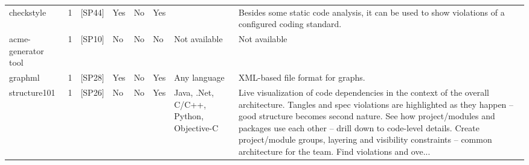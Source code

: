 \begin{tabular}{lrllllll}
          checkstyle &      1 &                                                 [SP44] &   Yes &       No &       Yes &                                                                                                                                                                                         &                                                                                                                                                                                                                                                                                                            Besides some static code analysis, it can be used to show violations of a configured coding standard. \\
 acme-generator tool &      1 &                                                 [SP10] &    No &       No &        No &                                                                                                                                                                           Not available &                                                                                                                                                                                                                                                                                                                                                                                                    Not available \\
             graphml &      1 &                                                 [SP28] &   Yes &       No &       Yes &                                                                                                                                                                            Any language &                                                                                                                                                                                                                                                                                                                                                                                XML-based file format for graphs. \\
        structure101 &      1 &                                                 [SP26] &    No &       No &       Yes &                                                                                                                                                  Java, .Net, C/C++, Python, Objective-C &  Live visualization of code dependencies in the context of the overall architecture. Tangles and spec violations are highlighted as they happen – good structure becomes second nature. See how project/modules and packages use each other – drill down to code-level details. Create project/module groups, layering and visibility constraints – common architecture for the team. Find violations and ove... \\

\end{tabular}
